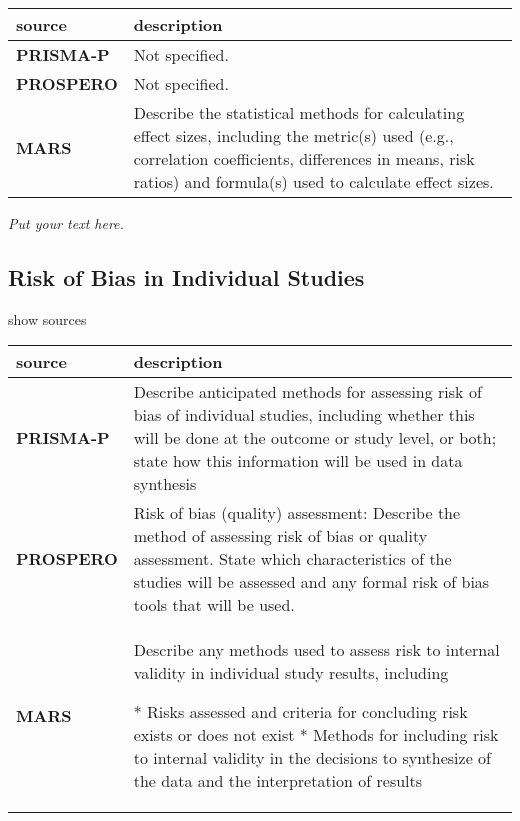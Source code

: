 \documentclass[]{article}
\begin{document}
\hypertarget{estfis}{}
\begin{table}[H]
\centering
\begin{tabular}{>{\bfseries}l|l}
\hline
\rowcolor[HTML]{ececec}  source & description\\
\hline
PRISMA-P & Not specified.\\
\hline
PROSPERO & Not specified.\\
\hline
MARS & Describe the statistical methods for calculating effect sizes, including the metric(s) used (e.g., correlation coefficients,
differences in means, risk ratios) and formula(s) used to calculate effect sizes.\\
\hline
\end{tabular}
\end{table}

\emph{Put your text here.}

\hypertarget{risk-of-bias-in-individual-studies}{%
\subsection{Risk of Bias in Individual
Studies}\label{risk-of-bias-in-individual-studies}}

show sources

\hypertarget{robiis}{}
\begin{table}[H]
\centering
\begin{tabular}{>{\bfseries}l|l}
\hline
\rowcolor[HTML]{ececec}  source & description\\
\hline
PRISMA-P & Describe anticipated methods for assessing risk of bias of individual studies, including whether this will be done at the outcome or study level, or both; state how this information will be used in data synthesis\\
\hline
PROSPERO & Risk of bias (quality) assessment: Describe the method of assessing risk of bias or quality assessment. State which characteristics of the studies will be assessed and any formal risk of bias tools that will be used.\\
\hline
MARS & Describe any methods used to assess risk to internal validity in individual study results, including

* Risks assessed and criteria for concluding risk exists or does not exist
* Methods for including risk to internal validity in the decisions to synthesize of the data and the interpretation of results\\
\hline
\end{tabular}
\end{table}
\end{document}
